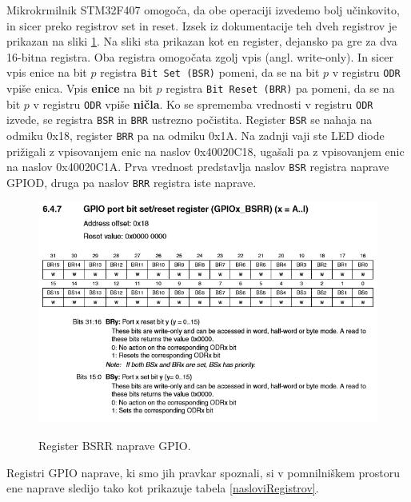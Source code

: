 \documentclass[12pt,letterpaper]{article}
\begin{document}
Mikrokrmilnik STM32F407 omogoča, da obe operaciji izvedemo bolj učinkovito, in sicer preko registrov set in reset. Izsek iz dokumentacije teh dveh registrov je prikazan na sliki \ref{bsrr}. Na sliki sta prikazan kot en register, dejansko pa gre za dva 16-bitna registra. Oba registra omogočata zgolj vpis (angl. write-only). In sicer vpis enice na bit $p$ registra \texttt{Bit Set (BSR)} pomeni, da se na bit $p$ v registru \texttt{ODR} vpiše enica. Vpis \textbf{enice} na bit $p$ registra \texttt{Bit Reset (BRR)} pa pomeni, da se na bit $p$ v registru \texttt{ODR} vpiše \textbf{ničla}. Ko se sprememba vrednosti v registru \texttt{ODR} izvede, se registra \texttt{BSR} in \texttt{BRR} ustrezno počistita. Register \texttt{BSR} se nahaja na odmiku 0x18, register \texttt{BRR} pa na odmiku 0x1A. Na zadnji vaji ste LED diode prižigali z vpisovanjem enic na naslov 0x40020C18, ugašali pa z vpisovanjem enic na naslov 0x40020C1A. Prva vrednost predstavlja naslov \texttt{BSR} registra naprave GPIOD, druga pa naslov \texttt{BRR} registra iste naprave.

\begin{figure}[ht!]
  \centering
  \caption{Register BSRR naprave GPIO.}
  \includegraphics[width=350pt]{images/vaja3/bsrr.png}
  \label{bsrr}
\end{figure}

Registri GPIO naprave, ki smo jih pravkar spoznali, si v pomnilniškem prostoru ene naprave sledijo tako kot prikazuje tabela \ref{nasloviRegistrov}.
\end{document}
